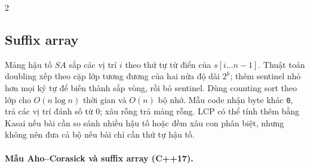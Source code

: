 \begin{multicols}{2}
\subsection{Suffix array}
Mảng hậu tố $SA$ sắp các vị trí $i$ theo thứ tự từ điển của
$s[i\ldots n-1]$. Thuật toán doubling xếp theo cặp lớp
tương đương của hai nửa độ dài $2^k$; thêm sentinel nhỏ hơn
mọi ký tự để biến thành sắp vòng, rồi bỏ sentinel.
Dùng counting sort theo lớp cho $O(n\log n)$ thời gian
và $O(n)$ bộ nhớ. Mẫu code nhận byte khác \texttt{0},
trả các vị trí đánh số từ $0$; xâu rỗng trả mảng rỗng.
LCP có thể tính thêm bằng Kasai nếu bài cần so sánh nhiều
hậu tố hoặc đếm xâu con phân biệt, nhưng không nên đưa
cả bộ nếu bài chỉ cần thứ tự hậu tố.

\paragraph{Mẫu Aho--Corasick và suffix array (C++17).}
\end{multicols}
\endgroup
